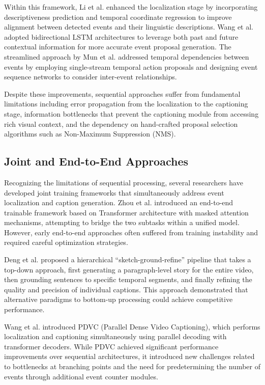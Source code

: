 Within this framework, Li et al. \cite{Li2018-ll} enhanced the localization stage by incorporating descriptiveness prediction and temporal coordinate regression to improve alignment between detected events and their linguistic descriptions.
Wang et al. \cite{Wang2018-ap} adopted bidirectional LSTM architectures to leverage both past and future contextual information for more accurate event proposal generation.
The streamlined approach by Mun et al. \cite{Mun2019-ap} addressed temporal dependencies between events by employing single-stream temporal action proposals \cite{buch2017sst} and designing event sequence networks to consider inter-event relationships.

Despite these improvements, sequential approaches suffer from fundamental limitations including error propagation from the localization to the captioning stage, information bottlenecks that prevent the captioning module from accessing rich visual context, and the dependency on hand-crafted proposal selection algorithms such as Non-Maximum Suppression (NMS).

\subsection{Joint and End-to-End Approaches}
Recognizing the limitations of sequential processing, several researchers have developed joint training frameworks that simultaneously address event localization and caption generation.
Zhou et al. \cite{Zhou2018-zu} introduced an end-to-end trainable framework based on Transformer architecture with masked attention mechanisms, attempting to bridge the two subtasks within a unified model.
However, early end-to-end approaches often suffered from training instability and required careful optimization strategies.

Deng et al. \cite{Deng2021-qd} proposed a hierarchical ``sketch-ground-refine'' pipeline that takes a top-down approach, first generating a paragraph-level story for the entire video, then grounding sentences to specific temporal segments, and finally refining the quality and precision of individual captions.
This approach demonstrated that alternative paradigms to bottom-up processing could achieve competitive performance.

Wang et al. \cite{Wang2021-zi} introduced PDVC (Parallel Dense Video Captioning), which performs localization and captioning simultaneously using parallel decoding with transformer decoders.
While PDVC achieved significant performance improvements over sequential architectures, it introduced new challenges related to bottlenecks at branching points and the need for predetermining the number of events through additional event counter modules.

